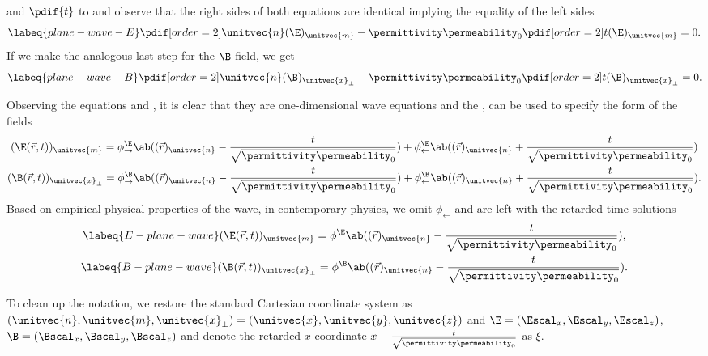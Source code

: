      and \(\pdif{t}\) to  and observe that the right sides of both equations are 
    identical implying the equality of the left sides
    \begin{equation}
        \labeq{plane-wave-E}
        \pdif[order={2}]{\unitvec{n}}(\E)_{\unitvec{m}} - \permittivity\permeability_0 \pdif[order={2}]{t}(\E)_{\unitvec{m}} = 0.
    \end{equation}
If we make the analogous last step for the \(\B\)-field, we get
    \begin{equation}
        \labeq{plane-wave-B}
        \pdif[order={2}]{\unitvec{n}}(\B)_{\unitvec{x}_{\perp}} - \permittivity\permeability_0 \pdif[order={2}]{t}(\B)_{\unitvec{x}_{\perp}} = 0.
    \end{equation}

Observing the equations  and , it is clear that they are one-dimensional wave
    equations and the , can be used to specify the form of the fields
    \begin{gather*}
        (\E(\vec{r}, t))_{\unitvec{m}} = \phi^{\E}_{\rightarrow}\ab((\vec{r})_{\unitvec{n}}  - \frac{t}{\sqrt{\permittivity\permeability_0}})
        + \phi^{\E}_{\leftarrow}\ab((\vec{r})_{\unitvec{n}} + \frac{t}{\sqrt{\permittivity\permeability_0}}) \\
        (\B(\vec{r}, t))_{\unitvec{x}_{\perp}} = \phi^{\B}_{\rightarrow}\ab((\vec{r})_{\unitvec{n}}  - \frac{t}{\sqrt{\permittivity\permeability_0}})
        + \phi^{\B}_{\leftarrow}\ab((\vec{r})_{\unitvec{n}} + \frac{t}{\sqrt{\permittivity\permeability_0}}).
    \end{gather*}
Based on empirical physical properties of the wave, in contemporary physics, we omit \(\phi_{\leftarrow}\) and are left
    with the retarded time solutions
    \begin{gather}
        \labeq{E-plane-wave}(\E(\vec{r}, t))_{\unitvec{m}} = \phi^{\E}\ab((\vec{r})_{\unitvec{n}}  - \frac{t}{\sqrt{\permittivity\permeability_0}}), \\
        \labeq{B-plane-wave}(\B(\vec{r}, t))_{\unitvec{x}_{\perp}} = \phi^{\B}\ab((\vec{r})_{\unitvec{n}}  - \frac{t}{\sqrt{\permittivity\permeability_0}}).
    \end{gather}

To clean up the notation, we restore the standard Cartesian coordinate system as 
    \((\unitvec{n}, \unitvec{m}, \unitvec{x}_{\perp}) = (\unitvec{x}, \unitvec{y}, \unitvec{z})\) and \(\E = (\Escal_x,
    \Escal_y, \Escal_z)\), \(\B = (\Bscal_x, \Bscal_y, \Bscal_z)\) and denote the retarded \(x\)-coordinate 
    \(x - \frac{t}{\sqrt{\permittivity\permeability_0}}\) as \(\xi\).

